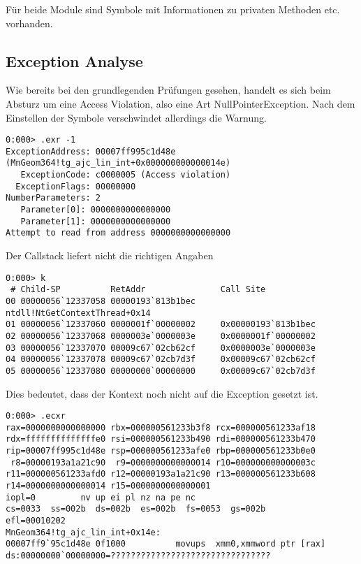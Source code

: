 Für beide Module sind Symbole mit Informationen zu privaten Methoden etc. vorhanden.

\subsection{Exception Analyse}

Wie bereits bei den grundlegenden Prüfungen gesehen, handelt es sich beim Absturz um eine Access Violation, also eine Art NullPointerException. Nach dem Einstellen der Symbole verschwindet allerdings die Warnung.

\begin{lstlisting}
0:000> .exr -1
ExceptionAddress: 00007ff995c1d48e (MnGeom364!tg_ajc_lin_int+0x000000000000014e)
   ExceptionCode: c0000005 (Access violation)
  ExceptionFlags: 00000000
NumberParameters: 2
   Parameter[0]: 0000000000000000
   Parameter[1]: 0000000000000000
Attempt to read from address 0000000000000000
\end{lstlisting}

Der Callstack liefert nicht die richtigen Angaben

\begin{lstlisting}
0:000> k
 # Child-SP          RetAddr               Call Site
00 00000056`12337058 00000193`813b1bec     ntdll!NtGetContextThread+0x14
01 00000056`12337060 0000001f`00000002     0x00000193`813b1bec
02 00000056`12337068 0000003e`0000003e     0x0000001f`00000002
03 00000056`12337070 00009c67`02cb62cf     0x0000003e`0000003e
04 00000056`12337078 00009c67`02cb7d3f     0x00009c67`02cb62cf
05 00000056`12337080 00000000`00000000     0x00009c67`02cb7d3f
\end{lstlisting}

Dies bedeutet, dass der Kontext noch nicht auf die Exception gesetzt ist.

\begin{lstlisting}
0:000> .ecxr
rax=0000000000000000 rbx=000000561233b3f8 rcx=000000561233af18
rdx=ffffffffffffffe0 rsi=000000561233b490 rdi=000000561233b470
rip=00007ff995c1d48e rsp=000000561233afe0 rbp=000000561233b0e0
 r8=00000193a1a21c90  r9=0000000000000014 r10=000000000000003c
r11=000000561233afd0 r12=00000193a1a21c90 r13=000000561233b608
r14=0000000000000014 r15=0000000000000001
iopl=0         nv up ei pl nz na pe nc
cs=0033  ss=002b  ds=002b  es=002b  fs=0053  gs=002b             efl=00010202
MnGeom364!tg_ajc_lin_int+0x14e:
00007ff9`95c1d48e 0f1000          movups  xmm0,xmmword ptr [rax] ds:00000000`00000000=????????????????????????????????
\end{lstlisting}

